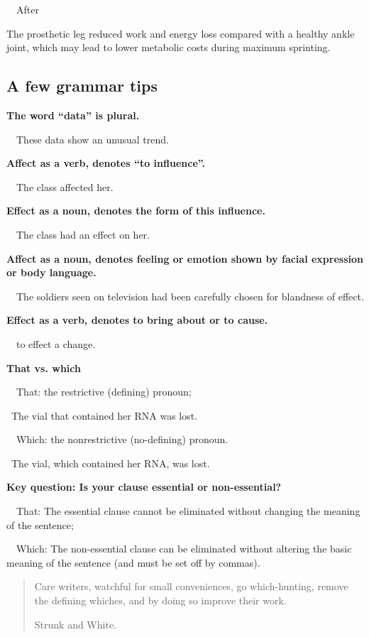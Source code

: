 \documentclass[a4paper, 12pt]{article}
\begin{document}
\par\ \textbullet\ After
\par The prosthetic leg reduced work and energy loss compared with a healthy ankle joint, which may lead to lower metabolic costs during maximum sprinting.

\newpage\subsection{A few grammar tips}

\textbf{The word ``data'' is plural.}
\par\ \textbullet\ These data show an unusual trend.

\textbf{Affect as a verb, denotes ``to influence''.}
\par\ \textbullet\ The class affected her.

\textbf{Effect as a noun, denotes the form of this influence.}
\par\ \textbullet\ The class had an effect on her.

\textbf{Affect as a noun, denotes feeling or emotion shown by facial expression or body language.}
\par\ \textbullet\ The soldiers seen on television had been carefully chosen for blandness of effect.

\textbf{Effect as a verb, denotes to bring about or to cause.}
\par\ \textbullet\ to effect a change.

\textbf{That vs. which}
\par\ \textbullet\ That: the restrictive (defining) pronoun;
\par\quad\textopenbullet\ The vial that contained her RNA was lost.
\par\ \textbullet\ Which: the nonrestrictive (no-defining) pronoun.
\par\quad\textopenbullet\ The vial, which contained her RNA, was lost.

\textbf{Key question: Is your clause essential or non-essential?}
\par\ \textbullet\ That: The essential clause cannot be eliminated without changing the meaning of the sentence;
\par\ \textbullet\ Which: The non-essential clause can be eliminated without altering the basic meaning of the sentence (and must be set off by commas).

\vspace{4pt}\begin{quote}
Care writers, watchful for small conveniences, go which-hunting, remove the defining whiches, and by doing so improve their work.
\begin{flushright}
Strunk and White.
\end{flushright}
\end{quote}
\end{document}
